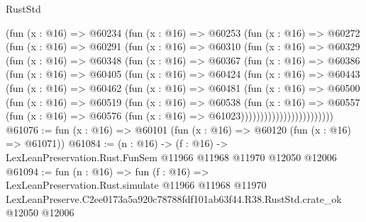 \begin{lexlean}{RustStd}
\begin{coremodule}
            (fun (x : @16) =>
            @60234
              (fun (x : @16) =>
              @60253
                (fun (x : @16) =>
                @60272
                  (fun (x : @16) =>
                  @60291
                    (fun (x : @16) =>
                    @60310
                      (fun (x : @16) =>
                      @60329
                        (fun (x : @16) =>
                        @60348
                          (fun (x : @16) =>
                          @60367
                            (fun (x : @16) =>
                            @60386
                              (fun (x : @16) =>
                              @60405
                                (fun (x : @16) =>
                                @60424
                                  (fun (x : @16) =>
                                  @60443
                                    (fun (x : @16) =>
                                    @60462
                                      (fun (x : @16) =>
                                      @60481
                                        (fun (x : @16) =>
                                        @60500
                                          (fun (x : @16) =>
                                          @60519
                                            (fun (x : @16) =>
                                            @60538
                                              (fun (x : @16) =>
                                              @60557
                                                (fun (x : @16) =>
                                                @60576
                                                  (fun (x : @16) => @61023))))))))))))))))))))))))
@61076 := fun (x : @16) => @60101 (fun (x : @16) => @60120 (fun (x : @16) => @61071))
@61084 := (n : @16) ->
  (f : @16) -> LexLeanPreservation.Rust.FunSem @11966 @11968 @11970 @12050 @12006
@61094 := fun (n : @16) =>
  fun (f : @16) =>
  LexLeanPreservation.Rust.simulate
    @11966
    @11968
    @11970
    LexLeanPreserve.C2ee0173a5a920c78788fdf101ab63f44.R38.RustStd.crate_ok
    @12050
    @12006
\end{coremodule}
\end{lexlean}
